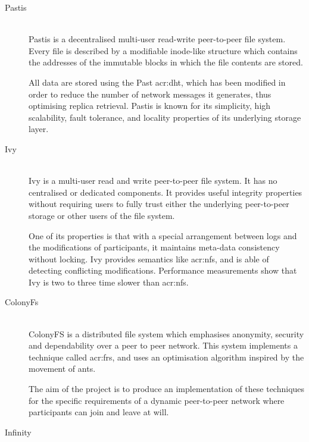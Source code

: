 \begin{description}
	\item[Pastis]\-\\
	Pastis \cite{Busca:2005gt} is a decentralised multi-user read-write peer-to-peer file system. Every file is described by
a modifiable inode-like structure which contains the addresses of the immutable blocks in which the file contents are stored.

All data are stored using the Past \gls{acr:dht}, which has been modified in order to reduce the number of network messages it generates, thus optimising replica retrieval. Pastis is known for its simplicity, high scalability, fault tolerance, and locality properties of its underlying storage layer.
	\item[Ivy]\-\\
	Ivy \cite{Muthitacharoen:2002iv} is a multi-user read and write peer-to-peer file system. It has no centralised or dedicated components. It provides useful integrity properties without requiring users to fully trust either the underlying peer-to-peer storage or other users of the file system.
	
	One of its properties is that with a special arrangement between logs and the modifications of participants, it maintains meta-data consistency without locking. Ivy provides semantics like \gls{acr:nfs}, and is able of detecting conflicting modifications. Performance measurements show that Ivy is two to three time slower than \gls{acr:nfs}.
	\item[ColonyFs]\-\\
	ColonyFS \cite{Colony:2009fs} is a distributed file system which emphasises anonymity, security and dependability over a peer to peer network. This system implements a technique called \gls{acr:frs}, and uses an optimisation algorithm inspired by the movement of ants.
	
	The aim of the project is to produce an implementation of these techniques for the specific requirements of a dynamic peer-to-peer network where participants can join and leave at will.
	\item[Infinity]\-\\
	
\end{description}